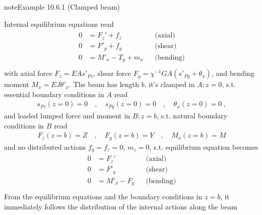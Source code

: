 \documentclass[letterpaper,10pt,english]{jupyterBook}
\begin{document}
\begin{sphinxadmonition}{note}{Example 10.6.1 (Clamped beam)}



\sphinxAtStartPar
Internal equilibrium equations read
\begin{equation*}
\begin{split}\begin{aligned}
  0 & = F_z' + f_z       && \text{(axial)}   \\
  0 & = F'_y + f_y       && \text{(shear)}   \\
  0 & = M'_x - T_y + m_x && \text{(bending)} \\
\end{aligned}\end{split}
\end{equation*}
\sphinxAtStartPar
with axial force \(F_z = EA s'_{Pz}\), shear force \(F_y = \chi^{-1} GA ( s'_{Py} + \theta_x )\), and bending moment \(M_x = EJ \theta'_x\). The beam has length \(b\), it’s clamped in \(A: z=0\), s.t. essential boundary conditions in \(A\) read
\begin{equation*}
\begin{split}s_{Pz}(z=0) = 0 \quad , \quad s_{Py}(z=0) = 0 \quad , \quad \theta_{x}(z=0) = 0 \ ,\end{split}
\end{equation*}
\sphinxAtStartPar
and loaded lumped force and moment in \(B: z=b\), s.t. natural boundary conditions in \(B\) read
\begin{equation*}
\begin{split}F_z(z=b) = Z \quad , \quad F_y(z=b) = Y \quad , \quad M_x(z=b) = M\end{split}
\end{equation*}
\sphinxAtStartPar
and no distributed actions \(f_y = f_z = 0\), \(m_z = 0\), s.t. equilibrium equation becomes
\begin{equation*}
\begin{split}\begin{aligned}
  0 & = F_z'             && \text{(axial)}   \\
  0 & = F'_y             && \text{(shear)}   \\
  0 & = M'_x - F_y       && \text{(bending)} \\
\end{aligned}\end{split}
\end{equation*}
\sphinxAtStartPar
From the equilibrium equations and the boundary conditions in \(z=b\), it immediately follows the distribution of the internal actions along the beam

\end{sphinxadmonition}
\end{document}
